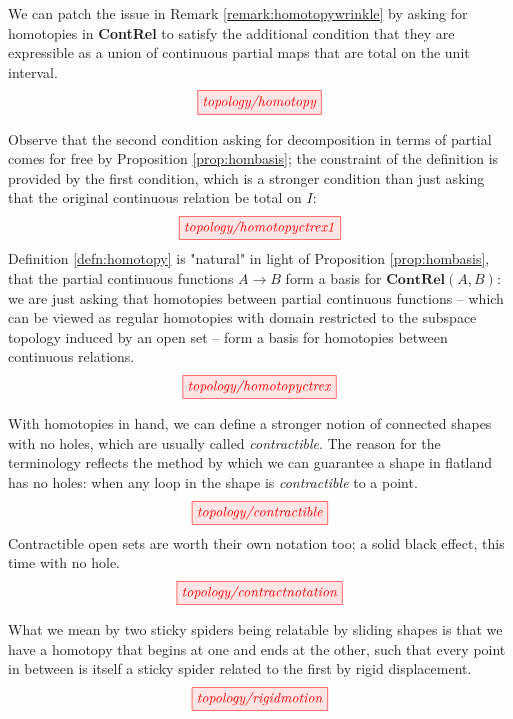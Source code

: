 \begin{myboxB}
\begin{defn}\label{defn:homotopy}
We can patch the issue in Remark \ref{remark:homotopywrinkle} by asking for homotopies in \textbf{ContRel} to satisfy the additional condition that they are expressible as a union of continuous partial maps that are total on the unit interval.
\[\tikzfig{topology/homotopy}\]
\end{defn}
\end{myboxB}

\begin{myboxR}
\begin{remark}
Observe that the second condition asking for decomposition in terms of partial comes for free by Proposition \ref{prop:hombasis}; the constraint of the definition is provided by the first condition, which is a stronger condition than just asking that the original continuous relation be total on $I$:
\[\tikzfig{topology/homotopyctrex1}\]
Definition \ref{defn:homotopy} is "natural" in light of Proposition \ref{prop:hombasis}, that the partial continuous functions $A \rightarrow B$ form a basis for $\mathbf{ContRel}(A,B)$: we are just asking that homotopies between partial continuous functions -- which can be viewed as regular homotopies with domain restricted to the subspace topology induced by an open set -- form a basis for homotopies between continuous relations.
\[\tikzfig{topology/homotopyctrex}\]
\end{remark}
\end{myboxR}

\begin{myboxB}
\begin{defn}[Contractibility]\label{defn:contractible}
With homotopies in hand, we can define a stronger notion of connected shapes with no holes, which are usually called \emph{contractible}. The reason for the terminology reflects the method by which we can guarantee a shape in flatland has no holes: when any loop in the shape is \emph{contractible} to a point.
\[\tikzfig{topology/contractible}\]
Contractible open sets are worth their own notation too; a solid black effect, this time with no hole.
\[\tikzfig{topology/contractnotation}\]
\end{defn}
\end{myboxB}

\begin{myboxR}
\begin{defn}\label{defn:sliding}
What we mean by two sticky spiders being relatable by sliding shapes is that we have a homotopy that begins at one and ends at the other, such that every point in between is itself a sticky spider related to the first by rigid displacement.
\[\tikzfig{topology/rigidmotion}\]
\end{defn}
\end{myboxR}

